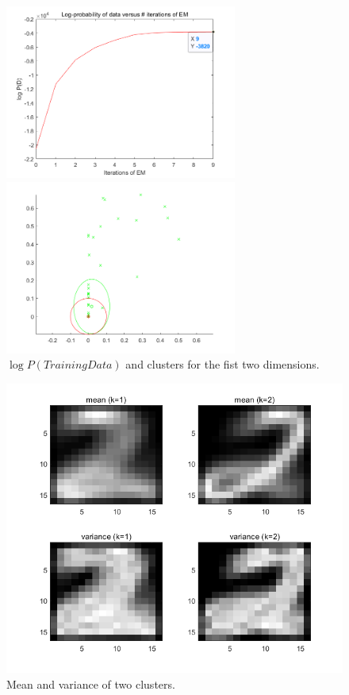 \documentclass{article}
\begin{document}
\begin{figure}[H]
\begin{minipage}[t]{0.5\linewidth}
\centering
\includegraphics[width=3in]{figure17_1}
\end{minipage}%
\begin{minipage}[t]{0.5\linewidth}
\centering
\includegraphics[width=3in]{figure17_2}
\end{minipage}
\caption{$\log P(TrainingData)$ and clusters for the fist two dimensions.}
\label{fig17}
\end{figure}

\begin{figure}[H]
	\centering
	\includegraphics[scale=0.6]{figure18}
	\caption{Mean and variance of two clusters.}
	\label{fig18}
\end{figure}
\end{document}
